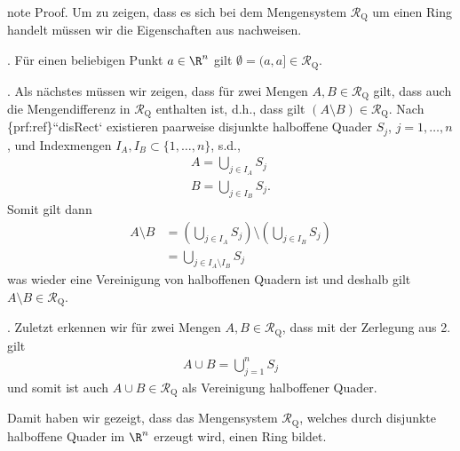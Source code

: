 \documentclass[letterpaper,10pt,english]{jupyterBook}
\begin{document}
\begin{sphinxadmonition}{note}
\sphinxAtStartPar
Proof. Um zu zeigen, dass es sich bei dem Mengensystem \(\mathcal{R}_{\text{Q}}\) um einen Ring handelt müssen wir die Eigenschaften aus {\hyperref[\detokenize{masstheorie/masstheorie:def:ring}]{}} nachweisen.

. Für einen beliebigen Punkt \(a \in \R^n\) gilt \(\emptyset = (a,a] \in \mathcal{R}_{\text{Q}}\).

. Als nächstes müssen wir zeigen, dass für zwei Mengen \(A,B \in \mathcal{R}_{\text{Q}}\) gilt, dass auch die Mengendifferenz in \(\mathcal{R}_{\text{Q}}\) enthalten ist, d.h., dass gilt \((A \setminus B) \in \mathcal{R}_{\text{Q}}\). Nach \{prf:ref\}``disRect` existieren paarweise disjunkte halboffene Quader \(S_j\), \(j=1,\ldots,n\), und Indexmengen \(I_A,I_B\subset\{1,\ldots,n\}\), s.d.,
\begin{equation*}
\begin{split}A = \bigcup_{j\in I_A} S_j\\
B = \bigcup_{j\in I_B} S_j.\end{split}
\end{equation*}
\sphinxAtStartPar
Somit gilt dann
\begin{equation*}
\begin{split}A\setminus B &= \left(\bigcup_{j\in I_A} S_j\right) \setminus \left(\bigcup_{j\in I_B} S_j\right)\\ 
&= \bigcup_{j\in I_A\setminus I_B} S_j\end{split}
\end{equation*}
\sphinxAtStartPar
was wieder eine Vereinigung von halboffenen Quadern ist und deshalb gilt \(A\setminus B\in \mathcal{R}_{\text{Q}}\).

. Zuletzt erkennen wir für zwei Mengen \(A,B \in \mathcal{R}_{\text{Q}}\), dass mit der Zerlegung aus 2. gilt
\begin{equation*}
\begin{split}A\cup B = \bigcup_{j=1}^n S_j\end{split}
\end{equation*}
\sphinxAtStartPar
und somit ist auch \(A\cup B\in\mathcal{R}_{\text{Q}}\) als Vereinigung halboffener Quader.

\sphinxAtStartPar
Damit haben wir gezeigt, dass das Mengensystem \(\mathcal{R}_{\text{Q}}\), welches durch disjunkte halboffene Quader im \(\R^n\) erzeugt wird, einen Ring bildet.
\end{sphinxadmonition}
\end{document}
